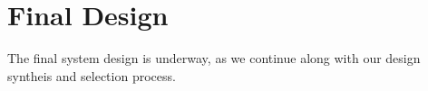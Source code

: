 \documentclass[../main.tex]{subfiles}
\begin{document}
\section{Final Design}\label{finalDesign}
\noindent The final system design is underway, as we continue along with our design syntheis and selection process.
\end{document}
